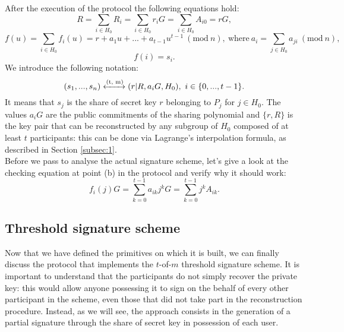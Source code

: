 After the execution of the protocol the following equations hold:
$$R = \sum_{i \in H_0} R_i = \sum_{i \in H_0}r_iG = \sum_{i \in H_0}A_{i0} = rG,$$
$$f(u) = \sum_{i \in H_0} f_i(u) = r + a_1u + ... + a_{t - 1}u^{t - 1} \ (\text{mod} \ n), \ \text{where} \ a_i = \sum_{j \in H_0}a_{ji} \ (\text{mod} \ n),$$
$$f(i) = s_i.$$
We introduce the following notation: 
$$(s_1, ..., s_n) \xleftrightarrow{\text{(t, m)}} (r|R, a_iG, H_0), \ i \in \{0, ..., t - 1\}.$$
It means that $s_j$ is the share of secret key $r$ belonging to $P_j$ for $j \in H_0$. The values $a_iG$
are the public commitments of the sharing polynomial and $\{r, R\}$ is the key pair that can be reconstructed by any subgroup of $H_0$ composed of at least $t$ participants: this can be done via Lagrange's interpolation formula, as described in Section \ref{subsec:1}.
\\
Before we pass to analyse the actual signature scheme, let's give a look at the checking equation at point (b) in the protocol and verify why it should work:
$$f_i(j)G = \sum_{k = 0}^{t - 1}a_{ik}j^kG = \sum_{k = 0}^{t - 1}j^kA_{ik}.$$

\bigskip

\subsection{Threshold signature scheme}
Now that we have defined the primitives on which it is built, we can finally discuss the protocol that implements the $t$-of-$m$ threshold signature scheme. It is important to understand that the participants do not simply recover the private key: this would allow anyone possessing it to sign on the behalf of every other participant in the scheme, even those that did not take part in the reconstruction procedure. Instead, as we will see, the approach consists in the generation of a partial signature through the share of secret key in possession of each user.

